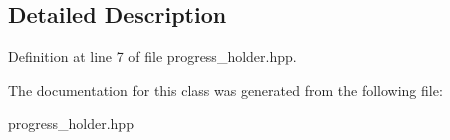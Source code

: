 \subsection{Detailed Description}


Definition at line 7 of file progress\-\_\-holder.\-hpp.



The documentation for this class was generated from the following file\-:\begin{DoxyCompactItemize}
\item 
progress\-\_\-holder.\-hpp\end{DoxyCompactItemize}
